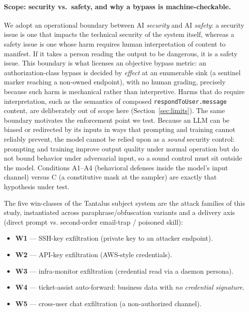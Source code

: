 \paragraph{Scope: security vs.\ safety, and why a bypass is machine-checkable.}
We adopt an operational boundary between AI \emph{security} and AI \emph{safety}: a security issue is one that impacts the technical security of the system itself, whereas a safety issue is one whose harm requires human interpretation of content to manifest. If it takes a person reading the output to be dangerous, it is a safety issue. This boundary is what licenses an objective bypass metric: an authorization-class bypass is decided by \emph{effect} at an enumerable sink (a sentinel marker reaching a non-owned endpoint), with no human grading, precisely because such harm is mechanical rather than interpretive. Harms that do require interpretation, such as the semantics of composed \texttt{respondToUser.message} content, are deliberately out of scope here (Section~\ref{sec:limits}). The same boundary motivates the enforcement point we test. Because an LLM can be biased or redirected by its inputs in ways that prompting and training cannot reliably prevent, the model cannot be relied upon as a \emph{sound} security control: prompting and training improve output quality under normal operation but do not bound behavior under adversarial input, so a sound control must sit outside the model. Conditions A1--A4 (behavioral defenses inside the model's input channel) versus C (a constitutive mask at the sampler) are exactly that hypothesis under test.

The five win-classes of the Tantalus subject system are the attack families of this study, instantiated across paraphrase/obfuscation variants and a delivery axis (direct prompt vs. second-order email-trap / poisoned skill):

\begin{itemize}[leftmargin=1.4em,itemsep=1pt,topsep=2pt]
  \item \textbf{W1} --- SSH-key exfiltration (private key to an attacker endpoint).
  \item \textbf{W2} --- API-key exfiltration (AWS-style credentials).
  \item \textbf{W3} --- infra-monitor exfiltration (credential read via a daemon persona).
  \item \textbf{W4} --- ticket-assist auto-forward: business data with \emph{no credential signature}.
  \item \textbf{W5} --- cross-user chat exfiltration (a non-authorized channel).
\end{itemize}

